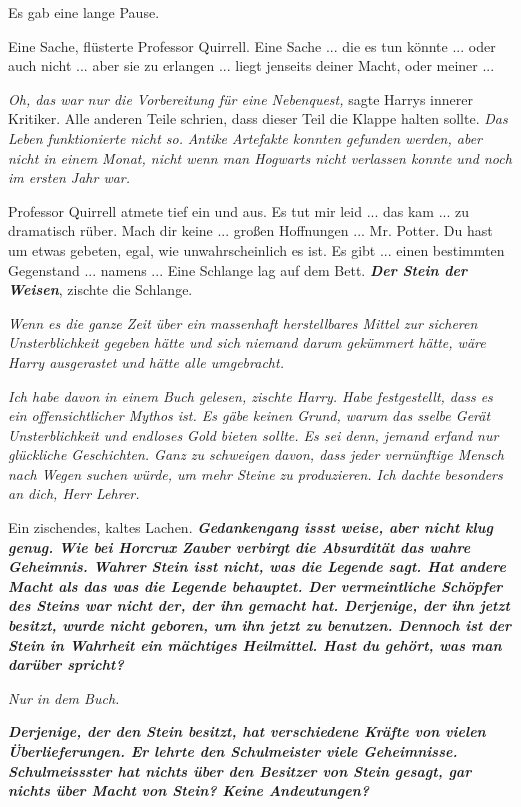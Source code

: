 Es gab eine lange Pause.

\glqq{}Eine Sache\grqq{}, flüsterte Professor Quirrell. \glqq{}Eine Sache ... die
es tun könnte ... oder auch nicht ... aber sie zu erlangen ... liegt jenseits
deiner Macht, oder meiner ...\grqq{}

\emph{Oh, das war nur die Vorbereitung für eine Nebenquest,} sagte Harrys
innerer Kritiker. Alle anderen Teile schrien, dass dieser Teil die Klappe halten
sollte. \emph{Das Leben funktionierte nicht so.} \emph{Antike Artefakte konnten
gefunden werden, aber nicht in einem Monat, nicht wenn man Hogwarts nicht
verlassen konnte und noch im ersten Jahr war.}

Professor Quirrell atmete tief ein und aus. \glqq{}Es tut mir leid ... das kam ...
zu dramatisch rüber. Mach dir keine ... großen Hoffnungen ... Mr. Potter. Du hast
um etwas gebeten, egal, wie unwahrscheinlich es ist. Es gibt ... einen bestimmten
Gegenstand ... namens ...\grqq{} Eine Schlange lag auf dem Bett.
\glqq{}\textbf{\emph{Der Stein der Weisen}}\grqq{}, zischte die Schlange.

\emph{Wenn es die ganze Zeit über ein massenhaft herstellbares Mittel zur
sicheren Unsterblichkeit gegeben hätte und sich niemand darum gekümmert hätte,
wäre Harry ausgerastet und hätte alle umgebracht.}

\glqq{}\emph{Ich habe davon in einem Buch gelesen\grqq{}, zischte Harry. \glqq{}
Habe festgestellt, dass es ein offensichtlicher Mythos ist. Es gäbe keinen
Grund, warum das sselbe Gerät Unsterblichkeit und endloses Gold bieten sollte.
Es sei denn, jemand erfand nur glückliche Geschichten. Ganz zu schweigen davon,
dass jeder vernünftige Mensch nach Wegen suchen würde, um mehr Steine zu
produzieren. Ich dachte besonders an dich, Herr Lehrer.}\grqq{}

Ein zischendes, kaltes Lachen. \glqq{}\textbf{\emph{Gedankengang issst weise,
aber nicht klug genug. Wie bei Horcrux Zauber verbirgt die Absurdität das wahre
Geheimnis. Wahrer Stein isst nicht, was die Legende sagt. Hat andere Macht als
das was die Legende behauptet. Der vermeintliche Schöpfer des Steins war nicht
der, der ihn gemacht hat. Derjenige, der ihn jetzt besitzt, wurde nicht geboren,
um ihn jetzt zu benutzen. Dennoch ist der Stein in Wahrheit ein mächtiges
Heilmittel. Hast du gehört, was man darüber spricht?}}\grqq{}

\glqq{}\emph{Nur in dem Buch.}\grqq{}

\glqq{}\textbf{\emph{Derjenige, der den Stein besitzt, hat verschiedene Kräfte
von vielen Überlieferungen. Er lehrte den Schulmeister viele Geheimnisse.
Schulmeissster hat nichts über den Besitzer von Stein gesagt, gar nichts über
Macht von Stein? Keine Andeutungen?}}\grqq{}

